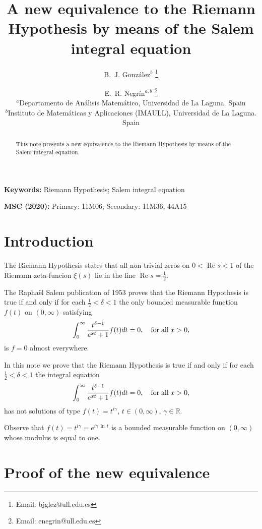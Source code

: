 \documentclass[11pt]{article}
\title{
A new equivalence to the Riemann Hypothesis by means of the Salem integral equation
}
\author{
B.~J. Gonz\'{a}lez$^b$ \thanks{Email: bjglez@ull.edu.es} \and
E.~R. Negr\'{i}n$^{a,b}$ \thanks{Email: enegrin@ull.edu.es} \\
\small $^a$Departamento de An\'alisis Matem\'atico, Universidad de La Laguna. Spain \\
\small $^b$Instituto de Matem\'aticas y Aplicaciones (IMAULL), Universidad de La Laguna. Spain
}
\date{}
\theoremstyle{remark}
\begin{document}
\maketitle

\begin{abstract}
This note presents a new equivalence to the Riemann Hypothesis by means of the Salem integral equation.
\end{abstract}

\bigskip

\noindent \textbf{Keywords:} Riemann Hypothesis; Salem integral equation

\medskip

\noindent \textbf{MSC (2020):} Primary: 11M06; Secondary: 11M36, 44A15

\section{Introduction}

\hspace{1 cm} The Riemann Hypothesis states that all non-trivial zeros on $0<\operatorname{Re} s<1$ of the Riemann zeta-funcion $\xi (s)$ lie in the line $\operatorname{Re} s=\frac{1}{2}$.

The Rapha\"el Salem publication of 1953 \cite{Salem} proves that the Riemann Hypothesis is true if and only if for each $\frac{1}{2}< \delta <1$ the only bounded measurable function $f(t)$ on $(0,\infty )$ satisfying
\[
\int_{0}^{\infty}\frac{t^{\delta -1}}{e^{xt}+1} f(t) dt =0,\quad \textrm{for\;all} \;x>0 ,
\] 
is $f=0$ almost everywhere.



In this note we prove that the Riemann Hypothesis is true if and only if for each $\frac{1}{2}<\delta <1$  the integral equation
\[
\int_{0}^{\infty}\frac{t^{\delta -1}}{e^{xt}+1} f(t) dt =0,\quad \textrm{for\;all}\;x>0,
\]
has not solutions of type $f(t) = t^{i\gamma}$, $t\in (0,\infty )$, $\gamma \in\mathbb{R}$.

Observe that $f(t) = t^{i\gamma}=e^{i\gamma \, \ln \, t}$ is a bounded measurable function on $(0,\infty )$ whose modulus is equal to one.


\section*{Proof of the new equivalence}
\end{document}
